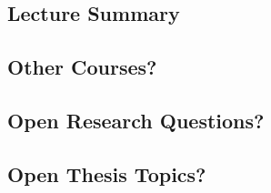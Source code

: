 \subsection{Lecture Summary}
\subsection{Other Courses?}
\subsection{Open Research Questions?}
\subsection{Open Thesis Topics?}
